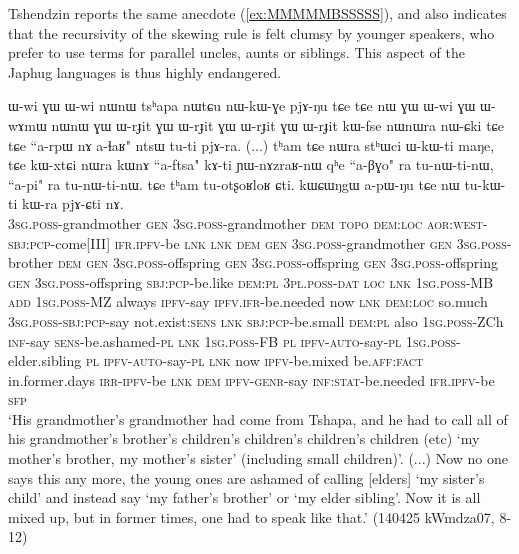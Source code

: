 Tshendzin reports the same anecdote (\ref{ex:MMMMMBSSSSS}), and also indicates that the recursivity of the skewing rule is felt clumsy by younger speakers, who prefer to use terms for parallel uncles, aunts or siblings. This aspect of the Japhug languages is thus highly endangered.
 
 \begin{exe}
\ex \label{ex:MMMMMBSSSSS}
\gll  ɯ-wi ɣɯ ɯ-wi nɯnɯ tsʰapa nɯtɕu nɯ-kɯ-ɣe pjɤ-ŋu tɕe tɕe nɯ ɣɯ ɯ-wi ɣɯ ɯ-wɤmɯ nɯnɯ ɣɯ ɯ-rɟit ɣɯ ɯ-rɟit ɣɯ ɯ-rɟit ɣɯ ɯ-rɟit kɯ-fse nɯnɯra nɯ-ɕki tɕe tɕe ``a-rpɯ nɤ a-ɬaʁ" ntsɯ tu-ti pjɤ-ra. (...) tʰam tɕe nɯra stʰɯci ɯ-kɯ-ti maŋe, tɕe kɯ-xtɕi nɯra kɯnɤ ``a-ftsa" kɤ-ti ɲɯ-nɤzraʁ-nɯ qʰe ``a-βɣo" ra tu-nɯ-ti-nɯ,  ``a-pi" ra tu-nɯ-ti-nɯ. tɕe tʰam tu-otʂoʁloʁ ɕti. kɯɕɯŋgɯ a-pɯ-ŋu tɕe nɯ tu-kɯ-ti kɯ-ra pjɤ-ɕti nɤ. \\
  \textsc{3sg}.\textsc{poss}-grandmother \textsc{gen}   \textsc{3sg}.\textsc{poss}-grandmother \textsc{dem}   \textsc{topo} \textsc{dem}:\textsc{loc} \textsc{aor}:\textsc{west}-\textsc{sbj}:\textsc{pcp}-come[III] \textsc{ifr}.\textsc{ipfv}-be \textsc{lnk} \textsc{lnk} \textsc{dem} \textsc{gen} \textsc{3sg}.\textsc{poss}-grandmother \textsc{gen} \textsc{3sg}.\textsc{poss}-brother \textsc{dem} \textsc{gen} \textsc{3sg}.\textsc{poss}-offspring  \textsc{gen} \textsc{3sg}.\textsc{poss}-offspring  \textsc{gen} \textsc{3sg}.\textsc{poss}-offspring  \textsc{gen} \textsc{3sg}.\textsc{poss}-offspring \textsc{sbj}:\textsc{pcp}-be.like \textsc{dem}:\textsc{pl} \textsc{3pl}.\textsc{poss}-\textsc{dat} \textsc{loc} \textsc{lnk} \textsc{1sg}.\textsc{poss}-MB \textsc{add} \textsc{1sg}.\textsc{poss}-MZ always \textsc{ipfv}-say \textsc{ipfv}.\textsc{ifr}-be.needed {  } now \textsc{lnk} \textsc{dem}:\textsc{loc} so.much \textsc{3sg}.\textsc{poss}-\textsc{sbj}:\textsc{pcp}-say not.exist:\textsc{sens} \textsc{lnk} \textsc{sbj}:\textsc{pcp}-be.small \textsc{dem}:\textsc{pl} also \textsc{1sg}.\textsc{poss}-ZCh \textsc{inf}-say \textsc{sens}-be.ashamed-\textsc{pl} \textsc{lnk} \textsc{1sg}.\textsc{poss}-FB \textsc{pl} \textsc{ipfv}-\textsc{auto}-say-\textsc{pl} \textsc{1sg}.\textsc{poss}-elder.sibling \textsc{pl} \textsc{ipfv}-\textsc{auto}-say-\textsc{pl}  \textsc{lnk} now \textsc{ipfv}-be.mixed be.\textsc{aff}:\textsc{fact} in.former.days \textsc{irr}-\textsc{ipfv}-be \textsc{lnk} \textsc{dem} \textsc{ipfv}-\textsc{genr}-say \textsc{inf}:\textsc{stat}-be.needed \textsc{ifr}.\textsc{ipfv}-be \textsc{sfp} \\
 \glt `His grandmother's grandmother had come from Tshapa, and he had to call all of his grandmother's brother's children's children's children's children (etc) `my mother's brother, my mother's sister' (including small children)'. (...) Now no one says this any more, the young ones are ashamed of calling [elders] `my sister's child' and instead say `my father's brother' or `my elder sibling'. Now it is all mixed up, but in former times, one had to speak like that.' (140425 kWmdza07, 8-12)
 \end{exe}
 
